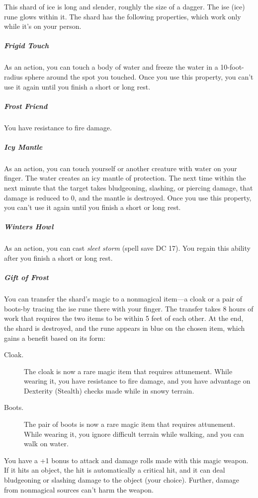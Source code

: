 \documentclass[10pt,a4paper,twoside,bg=print,twocolumn,openany,nodeprecatedcode]{dndbook}
\begin{document}
This shard of ice is long and slender, roughly the size of a dagger. The ise (ice) rune glows within it. The shard has the following properties, which work only while it's on your person.

\subparagraph{Frigid Touch}
As an action, you can touch a body of water and freeze the water in a 10-foot-radius sphere around the spot you touched. Once you use this property, you can't use it again until you finish a short or long rest.

\subparagraph{Frost Friend}
You have resistance to fire damage.

\subparagraph{Icy Mantle}
As an action, you can touch yourself or another creature with water on your finger. The water creates an icy mantle of protection. The next time within the next minute that the target takes bludgeoning, slashing, or piercing damage, that damage is reduced to 0, and the mantle is destroyed. Once you use this property, you can't use it again until you finish a short or long rest.

\subparagraph{Winters Howl}
As an action, you can cast \textit{sleet storm} (spell save DC 17). You regain this ability after you finish a short or long rest.

\subparagraph{Gift of Frost}
You can transfer the shard's magic to a nonmagical item—a cloak or a pair of boots-by tracing the ise rune there with your finger. The transfer takes 8 hours of work that requires the two items to be within 5 feet of each other. At the end, the shard is destroyed, and the rune appears in blue on the chosen item, which gains a benefit based on its form:


\begin{description}
\item[Cloak.]
The cloak is now a rare magic item that requires attunement. While wearing it, you have resistance to fire damage, and you have advantage on Dexterity (Stealth) checks made while in snowy terrain.
\item[Boots.]
The pair of boots is now a rare magic item that requires attunement. While wearing it, you ignore difficult terrain while walking, and you can walk on water.
\end{description}

You have a +1 bonus to attack and damage rolls made with this magic weapon. If it hits an object, the hit is automatically a critical hit, and it can deal bludgeoning or slashing damage to the object (your choice). Further, damage from nonmagical sources can't harm the weapon.
\end{document}
